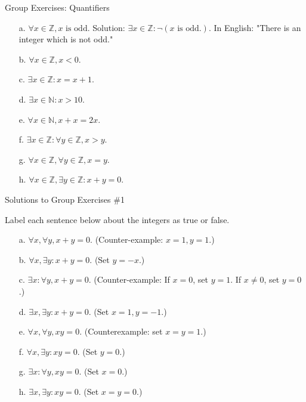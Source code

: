 \documentclass[10pt]{beamer}
\begin{document}
\begin{frame}{Group Exercises: Quantifiers}
\begin{minipage}{0.38\textwidth}
\begin{itemize}
        \item[a.] $\forall x \in \mathbb{Z}, x \text{ is odd.} $  \alert{Solution: $\exists x \in \mathbb{Z}: \lnot (x \text{ is odd}.)$. In English: "There is an integer which is not odd."}
        \item[b.] $\forall x \in \mathbb{Z}, x<0.$ 
        \item[c.] $\exists x \in \mathbb{Z}: x=x+1.$
        \item[d.] $\exists x \in \mathbb{N}: x>10.$
        \item[e.] $\forall x \in \mathbb{N}, x+x=2x.$
        \item[f.] $\exists x \in \mathbb{Z}: \forall y \in \mathbb{Z}, x>y.$
        \item[g.]  $\forall x \in \mathbb{Z}, \forall y \in \mathbb{Z}, x=y.$
        \item[h.] $\forall x \in \mathbb{Z}, \exists y \in \mathbb{Z}: x+y=0.$
    \end{itemize}
\end{minipage}

\end{frame}

\begin{frame}{Solutions to Group Exercises \#1}

 Label each sentence below about the integers as true or false. 
    \begin{itemize}
        \item[a.] $\forall x, \forall y, x+y=0.$   (Counter-example: $x=1, y=1$.)
        \item[b.] $\forall x, \exists y: x+y=0.$  (Set $y=-x$.) 
        \item[c.] $\exists x: \forall y, x+y=0.$   (Counter-example: If $x=0$, set $y=1$. If $x \neq 0$, set $y=0$.)
        \item[d.] $\exists x, \exists y: x+y=0.$   (Set $x=1,y=-1$.)
        \item[e.] $\forall x, \forall y, xy=0.$   (Counterexample: set $x=y=1$.)
        \item[f.] $\forall x, \exists y: xy=0.$  (Set $y=0$.)
        \item[g.] $\exists x: \forall y, xy=0.$  (Set $x=0$.)
        \item[h.] $\exists x, \exists y: xy=0.$  (Set $x=y=0$.)
    \end{itemize}


\end{frame}
\end{document}
